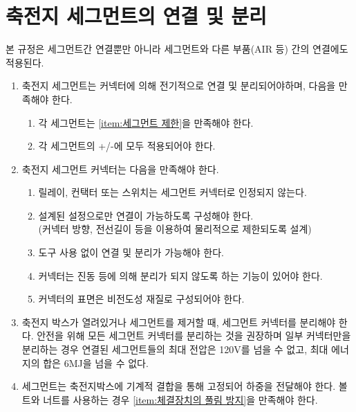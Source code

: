 \documentclass[final,a4paper,10pt]{report}
\begin{document}
\section{축전지 세그먼트의 연결 및 분리}\label{rule:formula-technical.accumulator-segments} \label{section:세그먼트 연결}
본 규정은 세그먼트간 연결뿐만 아니라 세그먼트와 다른 부품(AIR 등) 간의 연결에도 적용된다.
\begin{enumerate}
  \item\label{rule:formula-technical.accumulator-segments.connector-separation} 축전지 세그먼트는 커넥터에 의해 전기적으로 연결 및 분리되어야하며, 다음을 만족해야 한다.
    \begin{enumerate}
      \item\label{rule:formula-technical.accumulator-segments.connector-separation.segment-cap-compliance} 각 세그먼트는 \ref{item:세그먼트 제한}을 만족해야 한다.
      \item\label{rule:formula-technical.accumulator-segments.connector-separation.both-polarity-terminals} 각 세그먼트의 +/-에 모두 적용되어야 한다.
    \end{enumerate}

  \item\label{rule:formula-technical.accumulator-segments.connector-design} 축전지 세그먼트 커넥터는 다음을 만족해야 한다.
    \begin{enumerate}
      \item\label{rule:formula-technical.accumulator-segments.connector-design.excludes-relays-contactors-switches} 릴레이, 컨택터 또는 스위치는 세그먼트 커넥터로 인정되지 않는다.
      \item\label{rule:formula-technical.accumulator-segments.connector-design.connector-keying} 설계된 설정으로만 연결이 가능하도록 구성해야 한다.\\
        (커넥터 방향, 전선길이 등을 이용하여 물리적으로 제한되도록 설계)
      \item\label{rule:formula-technical.accumulator-segments.connector-design.no-tools-required} 도구 사용 없이 연결 및 분리가 가능해야 한다.
      \item\label{rule:formula-technical.accumulator-segments.connector-design.vibration-resistant-locking} 커넥터는 진동 등에 의해 분리가 되지 않도록 하는 기능이 있어야 한다.
      \item\label{rule:formula-technical.accumulator-segments.connector-design.non-conductive-surface} 커넥터의 표면은 비전도성 재질로 구성되어야 한다.
    \end{enumerate}

  \item\label{rule:formula-technical.accumulator-segments.partial-disconnect-limits} 축전지 박스가 열려있거나 세그먼트를 제거할 때, 세그먼트 커넥터를 분리해야 한다. 안전을 위해 모든 세그먼트 커넥터를 분리하는 것을 권장하며 일부 커넥터만을 분리하는 경우 연결된 세그먼트들의 최대 전압은 120V를 넘을 수 없고, 최대 에너지의 합은 6MJ을 넘을 수 없다.
  \item\label{rule:formula-technical.accumulator-segments.mechanical-load-transfer} 세그먼트는 축전지박스에 기계적 결합을 통해 고정되어 하중을 전달해야 한다. 볼트와 너트를 사용하는 경우 \ref{item:체결장치의 풀림 방지}을 만족해야 한다.
\end{enumerate}
\end{document}
